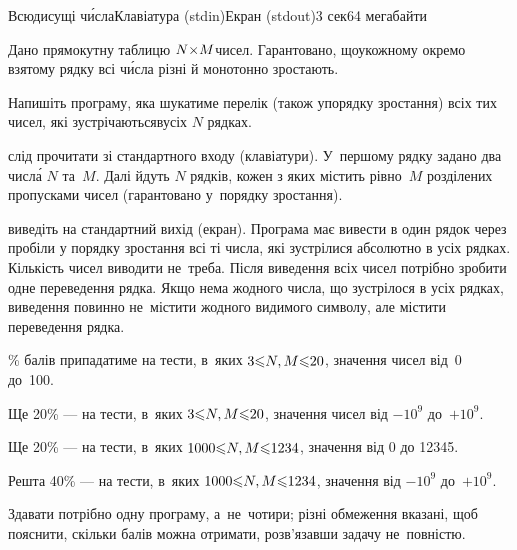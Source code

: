 \begin{problem}{Всюдисущі ч\'{и}сла}{Клавіатура (stdin)}{Екран (stdout)}{3 сек}{64 мегабайти}\label{sec:omnipresent-numbers}

Дано прямокутну таблицю $N{\times}M$\nolinebreak[3] чисел. Гарантовано, що\nolinebreak[2] у\nolinebreak[3] кожному окремо взятому рядку всі ч\'{и}сла різні й монотонно зростають.

Напишіть програму, яка шукатиме перелік (також у\nolinebreak[3] порядку зростання) всіх тих чисел, які зустрічаються\linebreak[1] в\nolinebreak[3] усіх $N$ рядках.

\InputFile	слід прочитати зі стандартного входу (клавіатури). У~першому рядку задано два числ\'{а} $N$ та~$M$. Далі йдуть $N$ рядків, кожен з яких містить рівно~$M$ розділених пропусками чисел (гарантовано у~порядку зростання). 

\OutputFile	виведіть на стандартний вихід (екран). Програма має вивести в один рядок через пробіли у порядку зростання всі ті числа, які зустрілися абсолютно в усіх рядках. Кількість чисел виводити не~треба. Після виведення всіх чисел потрібно зробити одне переведення рядка. Якщо нема жодного числа, що зустрілося в усіх рядках, виведення повинно не~містити жодного видимого символу, але містити переведення рядка.


\Example
\begin{exampleSimple}{6em}{3em}%
%
\end{exampleSimple}

\% балів припадатиме на тести, в~яких $3{\leqslant}{N,M}{\leqslant}20$, значення чисел від~0 до~100.

Ще 20\% --- на тести, в~яких $3{\leqslant}{N,M}{\leqslant}20$, значення чисел від $-10^9$ до~$+10^9$.

Ще 20\% --- на тести, в~яких $1000{\leqslant}{N,M}{\leqslant}1234$, значення від 0 до 12345.

Решта 40\% --- на тести, в~яких $1000{\leqslant}{N,M}{\leqslant}1234$, значення від $-10^9$ до~$+10^9$.

Здавати потрібно одну програму, а~не~чотири; різні обмеження вказані, щоб пояснити, скільки балів можна отримати, розв’язавши задачу не~повністю.


\end{problem}
